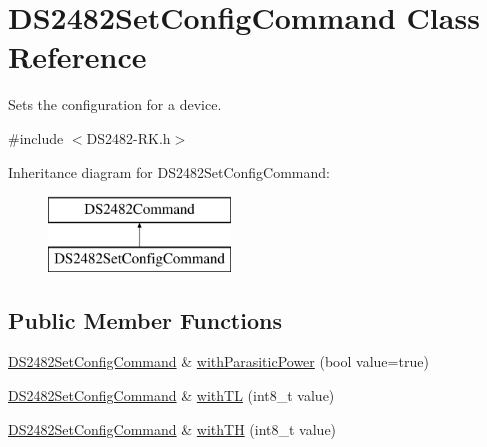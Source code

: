 \hypertarget{class_d_s2482_set_config_command}{}\section{D\+S2482\+Set\+Config\+Command Class Reference}
\label{class_d_s2482_set_config_command}


Sets the configuration for a device.  




{\ttfamily \#include $<$D\+S2482-\/\+R\+K.\+h$>$}

Inheritance diagram for D\+S2482\+Set\+Config\+Command\+:\begin{figure}[H]
\begin{center}
\leavevmode
\includegraphics[height=2.000000cm]{class_d_s2482_set_config_command}
\end{center}
\end{figure}
\subsection*{Public Member Functions}
\begin{DoxyCompactItemize}
\item 
\mbox{\hyperlink{class_d_s2482_set_config_command}{D\+S2482\+Set\+Config\+Command}} \& \mbox{\hyperlink{class_d_s2482_set_config_command_a9c1f96c1cb321f98970df4ef12bd97a7}{with\+Parasitic\+Power}} (bool value=true)
\item 
\mbox{\hyperlink{class_d_s2482_set_config_command}{D\+S2482\+Set\+Config\+Command}} \& \mbox{\hyperlink{class_d_s2482_set_config_command_a90b06127e4a7f88a3f4b4a69546f6e53}{with\+TL}} (int8\+\_\+t value)
\item 
\mbox{\hyperlink{class_d_s2482_set_config_command}{D\+S2482\+Set\+Config\+Command}} \& \mbox{\hyperlink{class_d_s2482_set_config_command_aab39af606ba1bf9a00e05129c7bd4fc9}{with\+TH}} (int8\+\_\+t value)
\end{DoxyCompactItemize}

